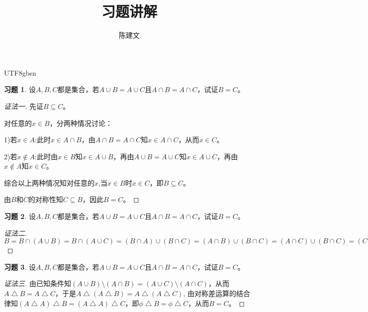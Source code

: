 \documentclass{beamer}
\begin{document}
\begin{CJK*}{UTF8}{gbsn}


  
\theoremstyle{definition}
\newtheorem{Def}{定义}
\theoremstyle{example}
\newtheorem*{Ex}{例：}
\newtheorem*{Exercise}{习题}

\date{}
\author{陈建文}
\title{习题讲解}

\begin{frame}
  \titlepage
\end{frame}
\begin{frame}

\begin{Exercise}
      设$A,B,C$都是集合，若$A\cup B = A\cup C$且$A\cap B = A\cap C$，试证$B=C$。
\end{Exercise}
\pause
\begin{proof}[证法一]\justifying\let\raggedright\justifying

  先证$B\subseteq C$。

  对任意的$x \in B$，分两种情况讨论：

  1)若$x \in A$:此时$x \in A\cap B$，由$A\cap B = A\cap C$知$x \in A\cap C$，从而$x \in C$。

  2)若$x \notin A$:此时由$x\in B$知$x\in A\cup B$，再由$A\cup B = A\cup C$知$x \in A\cup C$，再由$x \notin A$知$x \in C$。

  综合以上两种情况知对任意的$x$,当$x\in B$时$x\in C$，即$B \subseteq C$。
  

  由$B$和$C$的对称性知$C \subseteq B$，因此$B=C$。
\end{proof}

\end{frame}
\begin{frame}
\begin{Exercise}
      设$A,B,C$都是集合，若$A\cup B = A\cup C$且$A\cap B = A\cap C$，试证$B=C$。
\end{Exercise}
\pause
\begin{proof}[证法二]\justifying\let\raggedright\justifying

  $B= B\cap (A\cup B) = B \cap (A \cup C) = (B \cap A) \cup (B \cap C) = (A \cap B) \cup (B \cap C) = (A \cap C) \cup (B \cap C) = (C \cap A) \cup (C \cap B) = C \cap (A \cup B) = C \cap (A \cup C) = C$
  
\end{proof}  
\end{frame}

\begin{frame}
\begin{Exercise}
      设$A,B,C$都是集合，若$A\cup B = A\cup C$且$A\cap B = A\cap C$，试证$B=C$。
    \end{Exercise}
    \pause
\begin{proof}[证法三]\justifying\let\raggedright\justifying
由已知条件知$(A\cup B)\setminus (A\cap B) = (A\cup C)\setminus (A\cap C)$，从而$A\bigtriangleup B = A \bigtriangleup C$，于是$A \bigtriangleup (A\bigtriangleup B) =A \bigtriangleup (A \bigtriangleup C)$, 由对称差运算的结合律知$(A \bigtriangleup A)\bigtriangleup B =(A \bigtriangleup A) \bigtriangleup C$，即$\phi \bigtriangleup B = \phi \bigtriangleup C$，从而$B = C$。
\end{proof}
  
\end{frame}

\end{CJK*}
\end{document}

